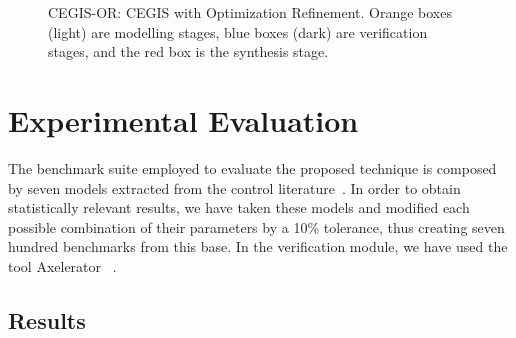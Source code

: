 \documentclass[sigconf]{llncs}
\begin{document}
\begin{figure}[t!]
{\begin{tikzpicture}[scale=0.3,->,>=stealth',shorten >=.2pt,auto, semithick, initial text=, ampersand replacement=\&,]

 \end{tikzpicture}
}
\caption{CEGIS-OR: CEGIS with Optimization Refinement. Orange boxes (light) are modelling
stages, blue boxes (dark) are verification stages, and the red box is the synthesis stage.}
\label{fig:CEGIS-OR}
\end{figure}

\section{Experimental Evaluation}
\label{exp:evaluation}

The benchmark suite employed to evaluate the proposed technique is 
composed by seven models extracted from the control literature~\cite{acrobot,cstr,CHEN1979389,KOKOTOVIC198023,gajic2008optimal,Franklin15,maglev,converters}.
In order to obtain statistically relevant results, we have taken these models
and modified each possible combination of their parameters by a 10\% tolerance,
thus creating seven hundred benchmarks from this base.
In the verification module, we have used the tool Axelerator~\cite{} .


\subsection{Results}
\label{exp:results}
\end{document}
